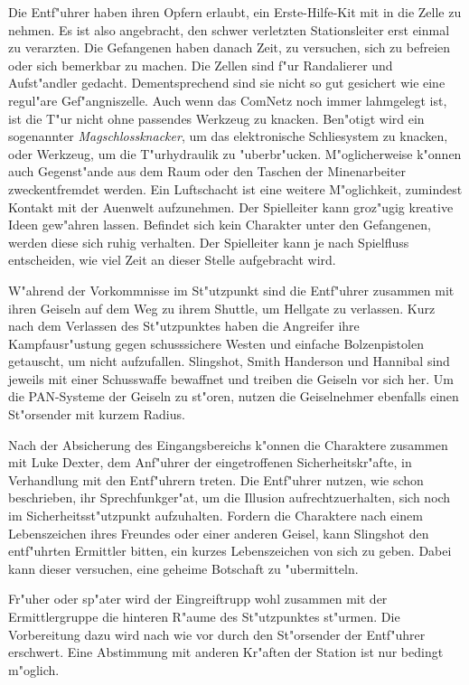 Die Entf"uhrer haben ihren Opfern erlaubt, ein Erste-Hilfe-Kit mit in die Zelle zu nehmen. Es ist also angebracht, den schwer verletzten Stationsleiter erst einmal zu verarzten. Die Gefangenen haben danach Zeit, zu versuchen, sich zu befreien oder sich bemerkbar zu machen. Die Zellen sind f"ur Randalierer und Aufst"andler gedacht. Dementsprechend sind sie nicht so gut gesichert wie eine regul"are Gef"angniszelle. Auch wenn das ComNetz noch immer lahmgelegt ist, ist die T"ur nicht ohne passendes Werkzeug zu knacken. Ben"otigt wird ein sogenannter \emph{Magschlossknacker}, um das elektronische Schlie\3system zu knacken, oder Werkzeug, um die T"urhydraulik zu "uberbr"ucken. M"oglicherweise k"onnen auch Gegenst"ande aus dem Raum oder den Taschen der Minenarbeiter zweckentfremdet werden. Ein Luftschacht ist eine weitere M"oglichkeit, zumindest Kontakt mit der Au\3enwelt aufzunehmen. Der Spielleiter kann gro\3z"ugig kreative Ideen gew"ahren lassen. Befindet sich kein Charakter unter den Gefangenen, werden diese sich ruhig verhalten. Der Spielleiter kann je nach Spielfluss entscheiden, wie viel Zeit an dieser Stelle aufgebracht wird.


W"ahrend der Vorkommnisse im St"utzpunkt sind die Entf"uhrer zusammen mit ihren Geiseln auf dem Weg zu ihrem Shuttle, um Hellgate zu verlassen. Kurz nach dem Verlassen des St"utzpunktes haben die Angreifer ihre Kampfausr"ustung gegen schusssichere Westen und einfache Bolzenpistolen getauscht, um nicht aufzufallen. Slingshot, Smith Handerson und Hannibal sind jeweils mit einer Schusswaffe bewaffnet und treiben die Geiseln vor sich her. Um die PAN-Systeme der Geiseln zu st"oren, nutzen die Geiselnehmer ebenfalls einen St"orsender mit kurzem Radius.

Nach der Absicherung des Eingangsbereichs k"onnen die Charaktere zusammen mit Luke Dexter, dem Anf"uhrer der eingetroffenen Sicherheitskr"afte, in Verhandlung mit den Entf"uhrern treten. Die Entf"uhrer nutzen, wie schon beschrieben, ihr Sprechfunkger"at, um die Illusion aufrechtzuerhalten, sich noch im Sicherheitsst"utzpunkt aufzuhalten. Fordern die Charaktere nach einem Lebenszeichen ihres Freundes oder einer anderen Geisel, kann Slingshot den entf"uhrten Ermittler bitten, ein kurzes Lebenszeichen von sich zu geben. Dabei kann dieser versuchen, eine geheime Botschaft zu "ubermitteln.

Fr"uher oder sp"ater wird der Eingreiftrupp wohl zusammen mit der Ermittlergruppe die hinteren R"aume des St"utzpunktes st"urmen. Die Vorbereitung dazu wird nach wie vor durch den St"orsender der Entf"uhrer erschwert. Eine Abstimmung mit anderen Kr"aften der Station ist nur bedingt m"oglich.

